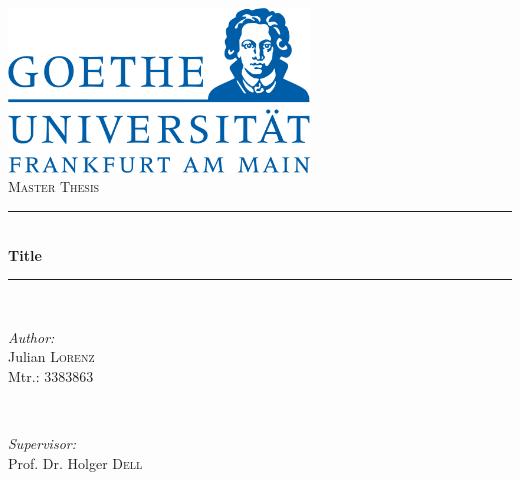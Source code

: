 \begin{titlepage}

\newcommand{\HRule}{\rule{\linewidth}{0.5mm}} %

\center %
 
\label{Heading}
\includegraphics[width=8cm]{images/logo.png}\\[1.5cm] %
\textsc{\Large Master Thesis}\\[0.5cm] %

\label{Title Section}
\HRule \\[0.5cm]
{ \huge \bfseries Title}\\[0.3cm] %
\HRule \\[1.5cm]
 
\label{Author}
\begin{minipage}{0.4\textwidth}
\begin{flushleft} \large
\emph{Author:}\\
Julian \textsc{Lorenz}\\
Mtr.: 3383863 %
\end{flushleft}
\end{minipage}
~
\begin{minipage}{0.4\textwidth}
\vspace*{0.3cm}
\begin{flushright} \large
\emph{Supervisor:} \\
Prof. Dr. Holger \textsc{Dell}\\
\color{white}{m}
\end{flushright}
\end{minipage}\\[4cm]



\end{titlepage}
